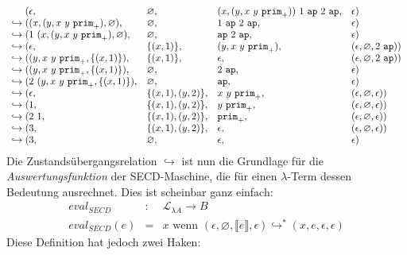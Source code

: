 \begin{displaymath}
  \begin{array}{l@{}llll}
&(\epsilon, &\varnothing, &(x, (y, x~y~\mathtt{prim}_+))~1~\mathtt{ap}~2~\mathtt{ap}, &\epsilon)\\
\hookrightarrow{}&((x, (y, x~y~\mathtt{prim}_+), \varnothing), &\varnothing, &1~\mathtt{ap}~2~\mathtt{ap}, &\epsilon)\\
\hookrightarrow{}&(1~(x, (y, x~y~\mathtt{prim}_+), \varnothing), &\varnothing, &\mathtt{ap}~2~\mathtt{ap}, &\epsilon)\\
\hookrightarrow{}&(\epsilon, &\{(x, 1)\}, &(y, x~y~\mathtt{prim}_+), &(\epsilon, \varnothing, 2~\mathtt{ap}))\\
\hookrightarrow{}&((y, x~y~\mathtt{prim}_+, \{(x, 1)\}), &\{(x, 1)\}, &\epsilon, &(\epsilon, \varnothing, 2~\mathtt{ap}))\\
\hookrightarrow{}&((y, x~y~\mathtt{prim}_+, \{(x, 1)\}), &\varnothing, &2~\mathtt{ap}, &\epsilon)\\
\hookrightarrow{}&(2~(y, x~y~\mathtt{prim}_+, \{(x, 1)\}), &\varnothing, &\mathtt{ap}, &\epsilon)\\
\hookrightarrow{}&(\epsilon, &\{(x, 1), (y, 2)\}, &x~y~\mathtt{prim}_+, &(\epsilon, \varnothing, \epsilon))\\
\hookrightarrow{}&(1, &\{(x, 1), (y, 2)\}, &y~\mathtt{prim}_+, &(\epsilon, \varnothing, \epsilon))\\
\hookrightarrow{}&(2~1, &\{(x, 1), (y, 2)\}, &\mathtt{prim}_+, &(\epsilon, \varnothing, \epsilon))\\
\hookrightarrow{}&(3, &\{(x, 1), (y, 2)\}, &\epsilon, &(\epsilon, \varnothing, \epsilon))\\
\hookrightarrow{}&(3, &\varnothing, &\epsilon, &\epsilon)
  \end{array}
\end{displaymath}
%
Die Zustandsübergangsrelation $\hookrightarrow$ ist nun die Grundlage
für die \textit{Auswertungsfunktion} der
SECD-Maschine, die für einen $\lambda$-Term dessen Bedeutung
ausrechnet.  Dies ist scheinbar ganz einfach:
%
\begin{eqnarray*}
  \mathit{eval}_\mathit{SECD} & : & \mathcal{L}_{\lambda{}A} \rightarrow B\\
  \mathit{eval}_\mathit{SECD}(e) &= & x \textrm{ wenn } (\epsilon, \varnothing, \llbracket e\rrbracket, \epsilon)
    \hookrightarrow^* (x, e, \epsilon, \epsilon)
\end{eqnarray*}
%
Diese Definition hat jedoch zwei Haken:
